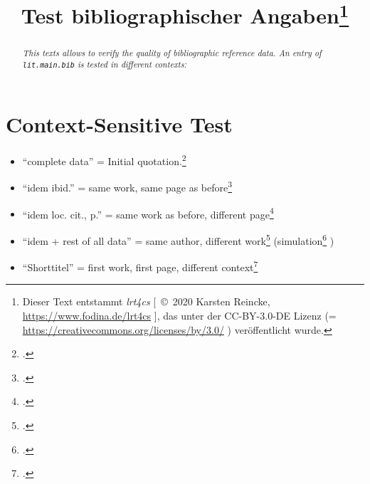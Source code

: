 \documentclass[
  DIV=calc,
  BCOR=5mm,
  11pt,
  headings=small,
  oneside,
  abstract=true,
  toc=bib,
  ngerman,english]{scrartcl}
\begin{document}
\nocite{*}

\titlehead{Bib\LaTeX}
\subject{Release 1.0}
\title{Test bibliographischer Angaben\footnote{Dieser Text entstammt \emph{lrt4cs} [\ \copyright\ 2020 Karsten Reincke, \href{https://www.fodina.de/lrt4cs}{https://www.fodina.de/lrt4cs} ], das unter der CC-BY-3.0-DE Lizenz (= \href{https://creativecommons.org/licenses/by/3.0/}{https://creativecommons.org/licenses/by/3.0/} ) veröffentlicht wurde.}}

\maketitle
\begin{abstract}
\noindent \itshape
This texts allows to verify the quality of bibliographic reference data. An entry of \texttt{lit.main.bib} is tested in different contexts:
\end{abstract}



\section{Context-Sensitive Test}
\begin{itemize}
  \item \enquote{complete data} = Initial quotation.\footcite[cf.][123]{KantKdrV1974}
  \item \enquote{idem ibid.} = same work, same page as before\footcite[cf.][123]{KantKdrV1974}
  \item \enquote{idem loc. cit., p.} = same work as before, different page\footcite[cf.][125f]{KantKdrV1974}
  \item \enquote{idem + rest of all data} = same author, different work\footcite[cf.][321]{KantKdpV1974} (simulation\footcite[cf.][42]{KantKdU1974} )
  \item \enquote{Shorttitel} = first work, first page, different context\footcite[cf.][123]{KantKdrV1974}
\end{itemize}



\printnomenclature
\printbibliography
\end{document}
